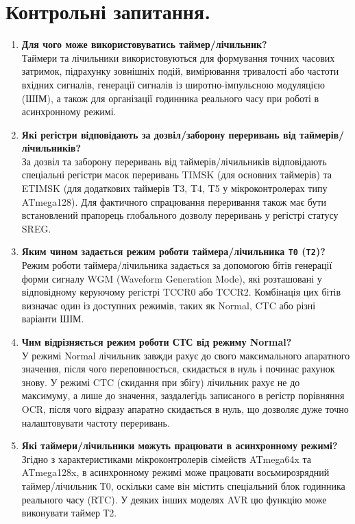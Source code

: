 \documentclass[14pt, a4paper]{extreport}
\begin{document}
	\section*{Контрольні запитання.}
	
	\begin{enumerate}
		\item \textbf{Для чого може використовуватись таймер/лічильник?} \\ Таймери та лічильники використовуються для формування точних часових затримок, підрахунку зовнішніх подій, вимірювання тривалості або частоти вхідних сигналів, генерації сигналів із широтно-імпульсною модуляцією (ШІМ), а також для організації годинника реального часу при роботі в асинхронному режимі.
		
		\item \textbf{Які регістри відповідають за дозвіл/заборону переривань від таймерів/лічильників?} \\ За дозвіл та заборону переривань від таймерів/лічильників відповідають спеціальні регістри масок переривань TIMSK (для основних таймерів) та ETIMSK (для додаткових таймерів T3, T4, T5 у мікроконтролерах типу ATmega128). Для фактичного спрацювання переривання також має бути встановлений прапорець глобального дозволу переривань у регістрі статусу SREG.
		
		\item \textbf{Яким чином задається режим роботи таймера/лічильника \texttt{Т0} (\texttt{Т2})?} \\ Режим роботи таймера/лічильника задається за допомогою бітів генерації форми сигналу WGM (Waveform Generation Mode), які розташовані у відповідному керуючому регістрі TCCR0 або TCCR2. Комбінація цих бітів визначає один із доступних режимів, таких як Normal, CTC або різні варіанти ШІМ.
		
		\item \textbf{Чим відрізняється режим роботи СТС від режиму Normal?} \\ У режимі Normal лічильник завжди рахує до свого максимального апаратного значення, після чого переповнюється, скидається в нуль і починає рахунок знову. У режимі CTC (скидання при збігу) лічильник рахує не до максимуму, а лише до значення, заздалегідь записаного в регістр порівняння OCR, після чого відразу апаратно скидається в нуль, що дозволяє дуже точно налаштовувати частоту переривань.
		
		\item \textbf{Які таймери/лічильники можуть працювати в асинхронному режимі?} \\ Згідно з характеристиками мікроконтролерів сімейств ATmega64x та ATmega128x, в асинхронному режимі може працювати восьмирозрядний таймер/лічильник Т0, оскільки саме він містить спеціальний блок годинника реального часу (RTC). У деяких інших моделях AVR цю функцію може виконувати таймер Т2.
		

\end{enumerate}
\end{document}
